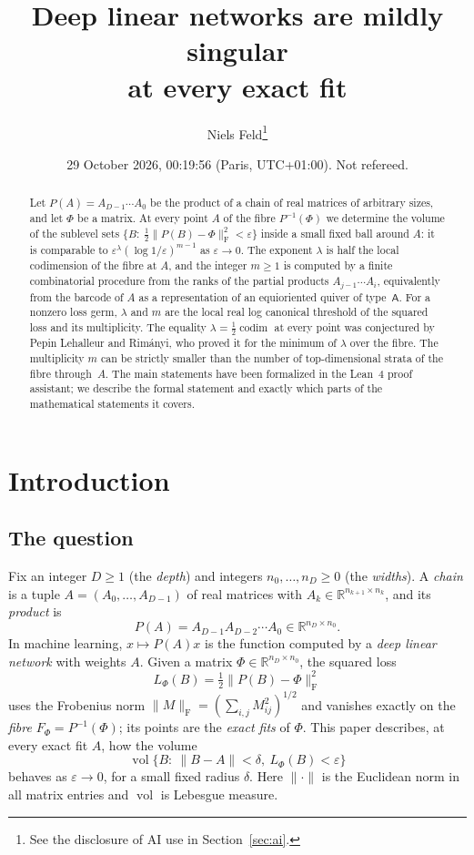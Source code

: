 \documentclass[11pt,a4paper]{article}
\theoremstyle{definition}
\theoremstyle{remark}
\numberwithin{equation}{section}
\newcommand{\R}{\mathbb{R}}
\newcommand{\codim}{\operatorname{codim}}
\newcommand{\vol}{\operatorname{vol}}
\newcommand{\Fr}[1]{\lVert #1\rVert_{\mathrm F}}
\newcommand{\norm}[1]{\lVert #1\rVert}
\newcommand{\eps}{\varepsilon}
\begin{document}
\title{Deep linear networks are mildly singular\\ at every exact fit}
\author{Niels Feld\thanks{See the disclosure of AI use in Section~\ref{sec:ai}.}}
\date{29 October 2026, 00:19:56 (Paris, UTC+01:00). Not refereed.}

\maketitle
\begin{abstract}
Let $P(A)=A_{D-1}\cdots A_0$ be the product of a chain of real matrices of arbitrary sizes, and let $\Phi$ be a matrix. At every point $A$ of the fibre $P^{-1}(\Phi)$ we determine the volume of the sublevel sets $\{B:\ \tfrac12\Fr{P(B)-\Phi}^2<\eps\}$ inside a small fixed ball around $A$: it is comparable to $\eps^{\lambda}(\log 1/\eps)^{m-1}$ as $\eps\to0$. The exponent $\lambda$ is half the local codimension of the fibre at $A$, and the integer $m\ge1$ is computed by a finite combinatorial procedure from the ranks of the partial products $A_{j-1}\cdots A_i$, equivalently from the barcode of $A$ as a representation of an equioriented quiver of type~$\mathsf A$. For a nonzero loss germ, $\lambda$ and $m$ are the local real log canonical threshold of the squared loss and its multiplicity. The equality $\lambda=\tfrac12\codim$ at every point was conjectured by Pepin Lehalleur and Rimányi, who proved it for the minimum of $\lambda$ over the fibre. The multiplicity $m$ can be strictly smaller than the number of top-dimensional strata of the fibre through~$A$. The main statements have been formalized in the Lean~4 proof assistant; we describe the formal statement and exactly which parts of the mathematical statements it covers.
\end{abstract}

\setcounter{tocdepth}{2}
\tableofcontents
\section{Introduction}\label{sec:intro}

\subsection{The question}
Fix an integer $D\ge1$ (the \emph{depth}) and integers $n_0,\dots,n_D\ge0$ (the \emph{widths}). A \emph{chain} is a tuple $A=(A_0,\dots,A_{D-1})$ of real matrices with $A_k\in\R^{n_{k+1}\times n_k}$, and its \emph{product} is
\[
P(A)=A_{D-1}A_{D-2}\cdots A_0\in\R^{n_D\times n_0}.
\]
In machine learning, $x\mapsto P(A)x$ is the function computed by a \emph{deep linear network} with weights $A$. Given a matrix $\Phi\in\R^{n_D\times n_0}$, the squared loss
\[
L_\Phi(B)=\tfrac12\Fr{P(B)-\Phi}^2
\]
uses the Frobenius norm $\Fr M=(\sum_{i,j}M_{ij}^2)^{1/2}$ and vanishes exactly on the \emph{fibre} $F_\Phi=P^{-1}(\Phi)$; its points are the \emph{exact fits} of $\Phi$. This paper describes, at every exact fit $A$, how the volume
\[
\vol\{B:\ \norm{B-A}<\delta,\ L_\Phi(B)<\eps\}
\]
behaves as $\eps\to0$, for a small fixed radius $\delta$. Here $\norm\cdot$ is the Euclidean norm in all matrix entries and $\vol$ is Lebesgue measure.
\end{document}
